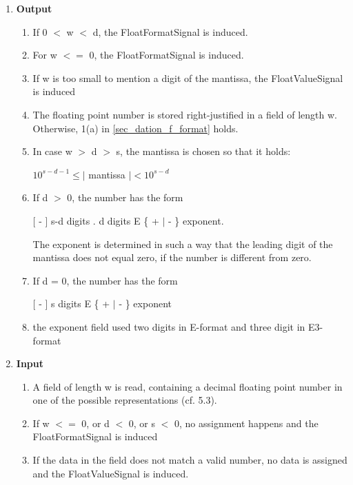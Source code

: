 \begin{added}
\begin{enumerate}
\item {\bf Output}\\
\begin{enumerate}
\item If 0 $<$ w $<$ d, the FloatFormatSignal is induced. 

\item For w $<=$ 0, the FloatFormatSignal is induced.

\item If w is too small to mention a digit of the mantissa, the FloatValueSignal is induced

\item The floating point number is stored right-justified in a field of length
w. Otherwise, 1(a) in \ref{sec_dation_f_format} holds.

\item In case w $>$ d $>$ s, the mantissa is chosen so that it holds:

\hspace*{1cm}$10^{s-d-1} \leq \mid$ mantissa $\mid < 10^{s-d}$

\item If d $>$ 0, the number has the form

\hspace*{1cm}[ - ] s-d digits . d digits E \{ + $\mid$ - \} exponent.

The exponent is determined in such a way that the leading digit of the
mantissa does not equal zero, if the number is different from zero.

\item If d = 0, the number has the form

\hspace*{1cm}[ - ] s digits E \{ + $\mid$ - \} exponent

\item the exponent field used two digits in E-format and 
      three digit in E3-format

\end{enumerate}
 
\item {\bf Input}\\
\begin{enumerate}
\item A field of length w is read,
    containing a decimal floating point number
    in one of the possible representations (cf. 5.3).

\item If w $<=$ 0, or d $<$ 0, or s $<$ 0, no assignment happens and  
         the FloatFormatSignal is induced
\item If the data in the field does not match a valid number, 
 no data is assigned and the FloatValueSignal is induced.
\end{enumerate}
\end{enumerate}


\end{added}

